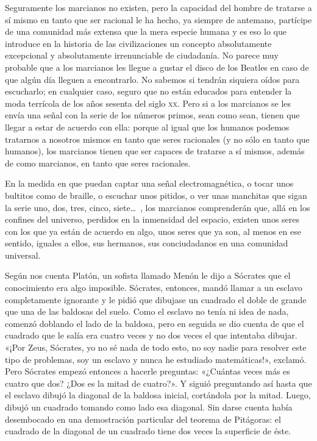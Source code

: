 \documentclass[draft,9pt,letterpaper,twocolumn,openany]{extbook}
\newcommand{\notar}[1]{\marginnote{\small\sffamily #1}[-.8em]}
\begin{document}
Seguramente los
marcianos no existen, pero la capacidad del hombre de
tratarse a sí mismo en tanto que ser racional le ha hecho, ya
siempre de antemano, partícipe de una comunidad más
extensa que la mera especie humana y es eso lo que
introduce en la historia de las civilizaciones un concepto
absolutamente excepcional y absolutamente irrenunciable de
ciudadanía. No parece muy probable que a los marcianos les
llegue a gustar el disco de los Beatles en caso de que algún
día lleguen a encontrarlo. No sabemos si tendrán siquiera
oídos para escucharlo; en cualquier caso, seguro que no
están educados para entender la moda terrícola de los años
sesenta del siglo \textsc{xx}. Pero si a los marcianos se les envía una
señal con la serie de los números primos, sean como sean,
tienen que llegar a estar de acuerdo con ella: porque al igual
que los humanos podemos tratarnos a nosotros mismos en
tanto que seres racionales (y no sólo en tanto que humanos),
los marcianos tienen que ser capaces de tratarse a sí
mismos, además de como marcianos, en tanto que seres
racionales. 

En la medida en que puedan captar una señal
electromagnética, o tocar unos bultitos como de braille, o
escuchar unos pitidos, o ver unas manchitas que sigan la
serie uno, dos, tres, cinco, siete\ldots~, los marcianos
comprenderán que, allá en los confines del universo,
perdidos en la inmensidad del espacio, existen unos
seres con los que ya están de acuerdo en algo,
unos seres que ya son, al menos en ese sentido, iguales
a ellos, sus hermanos, sus conciudadanos en una
comunidad universal.

Según nos cuenta Platón, un sofista llamado Menón le
dijo a Sócrates que el conocimiento era algo
imposible. Sócrates, entonces, mandó llamar a un esclavo
completamente ignorante y le pidió que dibujase un
cuadrado el doble de grande que una de las baldosas del
suelo. Como el esclavo no tenía ni idea de nada, comenzó
doblando el lado de la baldosa, pero en seguida se dio
cuenta de que el cuadrado que le salía era cuatro veces y
no dos veces el que intentaba dibujar. «¡Por Zeus,
Sócrates, yo no sé nada de todo esto, no soy nadie para
resolver este tipo de problemas, soy un esclavo y nunca
he estudiado matemáticas!», exclamó. Pero Sócrates
empezó entonces a hacerle preguntas: «¿Cuántas veces
más es cuatro que dos? ¿Dos es la mitad de cuatro?». Y
siguió preguntando así hasta que el esclavo dibujó la
diagonal de la baldosa inicial, cortándola por la mitad.
Luego, dibujó un cuadrado tomando como lado esa
diagonal. Sin darse cuenta había desembocado en una
demostración particular del teorema de Pitágoras: el
cuadrado de la diagonal de un cuadrado tiene dos veces
la superficie de éste.
\end{document}
